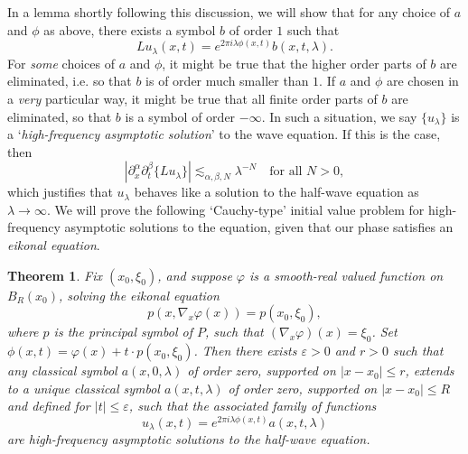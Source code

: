 \documentclass{article}
\theoremstyle{plain}
\newtheorem{theorem}{Theorem}
\theoremstyle{remark}
\theoremstyle{definition}
\begin{document}
%
%
%

In a lemma shortly following this discussion, we will show that for any choice of $a$ and $\phi$ as above, there exists a symbol $b$ of order $1$ such that
%
\[ L u_\lambda(x,t) = e^{2 \pi i \lambda \phi(x,t)} b(x,t,\lambda). \]
%
For \emph{some} choices of $a$ and $\phi$, it might be true that the higher order parts of $b$ are eliminated, i.e. so that $b$ is of order much smaller than $1$. If $a$ and $\phi$ are chosen in a \emph{very} particular way, it might be true that all finite order parts of $b$ are eliminated, so that $b$ is a symbol of order $-\infty$. In such a situation, we say $\{ u_\lambda \}$ is a `\emph{high-frequency asymptotic solution}' to the wave equation. If this is the case, then
%
\[ |\partial_x^\alpha \partial_t^\beta \{ L u_\lambda \}| \lesssim_{\alpha,\beta,N} \lambda^{-N} \quad\text{for all $N > 0$}, \]
which justifies that $u_\lambda$ behaves like a solution to the half-wave equation as $\lambda \to \infty$. We will prove the following `Cauchy-type' initial value problem for high-frequency asymptotic solutions to the equation, given that our phase satisfies an \emph{eikonal equation}.

\begin{theorem}
	Fix $(x_0,\xi_0)$, and suppose $\varphi$ is a smooth-real valued function on $B_R(x_0)$, solving the eikonal equation
	\[ p(x, \nabla_x \varphi(x) ) = p(x_0,\xi_0), \]
	where $p$ is the principal symbol of $P$, such that $(\nabla_x \varphi)(x) = \xi_0$.
%
 	Set $\phi(x,t) = \varphi(x) + t \cdot p(x_0,\xi_0)$. Then there exists $\varepsilon > 0$ and $r > 0$ such that any classical symbol $a(x,0,\lambda)$ of order zero, supported on $|x - x_0| \leq r$, extends to a unique classical symbol $a(x,t,\lambda)$ of order zero, supported on $|x - x_0| \leq R$ and defined for $|t| \leq \varepsilon$, such that the associated family of functions
	\[ u_\lambda(x,t) = e^{2 \pi i \lambda \phi(x,t)} a(x,t,\lambda) \]
	are high-frequency asymptotic solutions to the half-wave equation.
\end{theorem}
\end{document}
